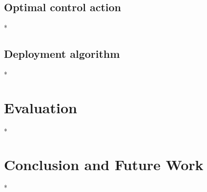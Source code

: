 \documentclass[letterpaper,10pt,conference]{ieeeconf}
\begin{document}
\subsection{Optimal control action}

*

\subsection{Deployment algorithm}

*

\section{Evaluation}
\label{sec:experimental}

*

\section{Conclusion and Future Work}
\label{sec:conclusion}

*


 
\vspace{0.1ex}

\newpage
\end{document}
